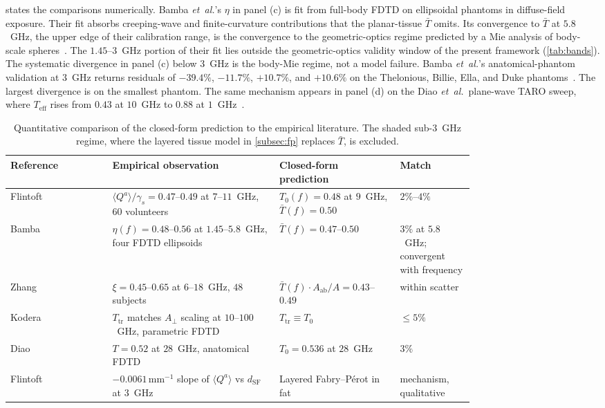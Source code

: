 \documentclass[journal,twocolumn,10pt]{IEEEtran}
\theoremstyle{plain}
\theoremstyle{remark}
\newcommand{\Aab}{A_{\mathrm{ab}}}
\newcommand{\Aperp}{A_\perp}
\newcommand{\Tbar}{\bar{T}}
\begin{document}
 states the comparisons numerically. Bamba
\textit{et~al.}'s $\eta$ in panel (c) is fit from full-body FDTD on
ellipsoidal phantoms in diffuse-field exposure. Their fit absorbs
creeping-wave and finite-curvature contributions that the
planar-tissue $\Tbar$ omits. Its convergence to $\Tbar$ at
$5.8$~GHz, the upper edge of their calibration range, is the
convergence to the geometric-optics regime predicted by a Mie
analysis of body-scale spheres~\cite{BohrenHuffman1983}. The
$1.45$--$3$~GHz portion of their fit lies outside the
geometric-optics validity window of the present framework
(\cref{tab:bands}). The systematic divergence in panel (c) below
$3$~GHz is the body-Mie regime, not a model failure. Bamba
\textit{et~al.}'s anatomical-phantom validation at $3$~GHz returns
residuals of $-39.4\%$, $-11.7\%$, $+10.7\%$, and $+10.6\%$ on the
Thelonious, Billie, Ella, and Duke phantoms~\cite[Table~7]{Bamba2014}.
The largest divergence is on the smallest phantom. The same
mechanism appears in panel (d) on the Diao \textit{et~al.}\ plane-wave
TARO sweep, where $T_{\mathrm{eff}}$ rises from $0.43$ at $10$~GHz
to $0.88$ at $1$~GHz~\cite{Diao2024}.

\begin{table}[!t]
\centering
\caption{Quantitative comparison of the closed-form prediction to the
empirical literature. The shaded sub-$3$~GHz regime, where the
layered tissue model in \cref{subsec:fp} replaces $\Tbar$, is
excluded.}
\label{tab:waterfall}
\begin{tabular}{lp{0.36\linewidth}p{0.26\linewidth}p{0.16\linewidth}}
\toprule
Reference & Empirical observation & Closed-form prediction & Match \\
\midrule
Flintoft~\cite{Flintoft2014}
& $\langle Q^a\rangle/\gamma_s = 0.47$--$0.49$ at $7$--$11$~GHz, $60$ volunteers
& $T_0(f) = 0.48$ at $9$~GHz, $\Tbar(f) = 0.50$
& $2\%$--$4\%$ \\
Bamba~\cite{Bamba2014}
& $\eta(f) = 0.48$--$0.56$ at $1.45$--$5.8$~GHz, four FDTD ellipsoids
& $\Tbar(f) = 0.47$--$0.50$
& $3\%$ at $5.8$~GHz; convergent with frequency \\
Zhang~\cite{Zhang2017thesis}
& $\xi = 0.45$--$0.65$ at $6$--$18$~GHz, $48$ subjects
& $\Tbar(f)\cdot\Aab/A = 0.43$--$0.49$
& within scatter \\
Kodera~\cite{Kodera2024}
& $T_{\mathrm{tr}}$ matches $\Aperp$ scaling at $10$--$100$~GHz, parametric FDTD
& $T_{\mathrm{tr}} \equiv T_0$
& $\le 5\%$ \\
Diao~\cite{Diao2024}
& $T = 0.52$ at $28$~GHz, anatomical FDTD
& $T_0 = 0.536$ at $28$~GHz
& $3\%$ \\
Flintoft~\cite{Flintoft2014}
& $-0.0061\,\mathrm{mm}^{-1}$ slope of $\langle Q^a\rangle$ vs $d_{\mathrm{SF}}$ at $3$~GHz
& Layered Fabry--P\'erot in fat
& mechanism, qualitative \\
\bottomrule
\end{tabular}
\end{table}
\end{document}
